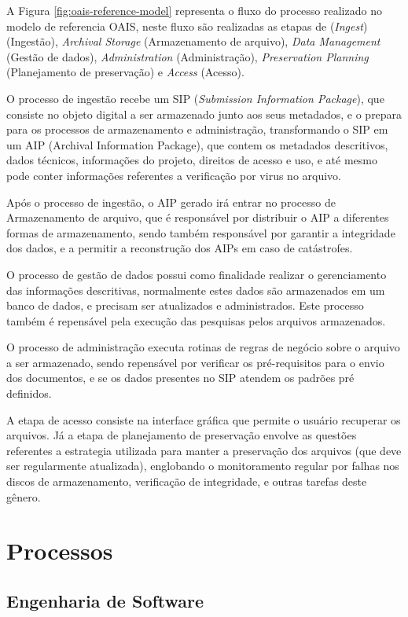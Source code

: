 A Figura \ref{fig:oais-reference-model} representa o fluxo do processo
realizado no modelo de referencia OAIS, neste fluxo são realizadas as
etapas de (\emph{Ingest}) (Ingestão), \emph{Archival Storage} (Armazenamento de arquivo),
\emph{Data Management} (Gestão de dados), \emph{Administration} (Administração),
\emph{Preservation Planning} (Planejamento de preservação) e \emph{Access} (Acesso).

O processo de ingestão recebe um SIP (\emph{Submission Information Package}),
que consiste no objeto digital a ser armazenado junto aos seus metadados, e o
prepara para os processos de armazenamento e administração, transformando o SIP
em um AIP (Archival Information Package), que contem os metadados descritivos,
dados técnicos, informações do projeto, direitos de acesso e uso, e
até mesmo pode conter informações referentes a verificação por virus no arquivo.

Após o processo de ingestão, o AIP gerado irá entrar no processo de
Armazenamento de arquivo, que é responsável por distribuir o AIP a
diferentes formas de armazenamento, sendo também responsável
por garantir a integridade dos dados, e a permitir a reconstrução dos AIPs em caso
de catástrofes.

O processo de gestão de dados possui como finalidade realizar o gerenciamento
das informações descritivas, normalmente estes dados são armazenados em um
banco de dados, e precisam ser atualizados e administrados. Este processo
também é repensável pela execução das pesquisas pelos arquivos armazenados.

O processo de administração executa rotinas de regras de negócio sobre o arquivo a
ser armazenado, sendo repensável por verificar os pré-requisitos para o
envio dos documentos, e se os dados presentes no SIP atendem os padrões
pré definidos.

A etapa de acesso consiste na interface gráfica que permite o usuário
recuperar os arquivos. Já a etapa de planejamento de preservação
envolve as questões referentes a estrategia utilizada para manter a preservação
dos arquivos (que deve ser regularmente atualizada), englobando o monitoramento
regular por falhas nos discos de armazenamento, verificação de integridade,
e outras tarefas deste gênero.


\section{Processos}\label{sec:process}

\subsection{Engenharia de Software}

